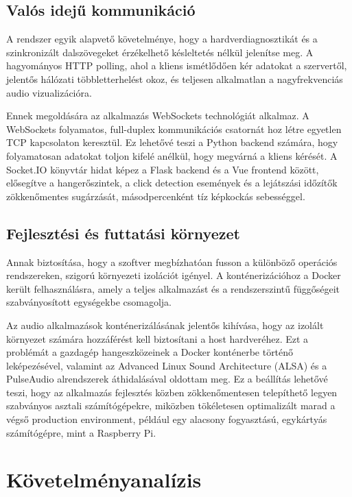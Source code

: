 \documentclass[12pt,a4paper,hungarian]{report}
\begin{document}
\section{Valós idejű kommunikáció}

A rendszer egyik alapvető követelménye, hogy a hardverdiagnosztikát és a szinkronizált dalszövegeket érzékelhető késleltetés nélkül jelenítse meg. A hagyományos HTTP polling, ahol a kliens ismétlődően kér adatokat a szervertől, jelentős hálózati többletterhelést okoz, és teljesen alkalmatlan a nagyfrekvenciás audio vizualizációra.

Ennek megoldására az alkalmazás WebSockets technológiát alkalmaz. A WebSockets folyamatos, full-duplex kommunikációs csatornát hoz létre egyetlen TCP kapcsolaton keresztül. Ez lehetővé teszi a Python backend számára, hogy folyamatosan adatokat toljon kifelé anélkül, hogy megvárná a kliens kérését. A Socket.IO könyvtár hidat képez a Flask backend és a Vue frontend között, elősegítve a hangerőszintek, a click detection események és a lejátszási időzítők zökkenőmentes sugárzását, másodpercenként tíz képkockás sebességgel.

\section{Fejlesztési és futtatási környezet}

Annak biztosítása, hogy a szoftver megbízhatóan fusson a különböző operációs rendszereken, szigorú környezeti izolációt igényel. A konténerizációhoz a Docker került felhasználásra, amely a teljes alkalmazást és a rendszerszintű függőségeit szabványosított egységekbe csomagolja.

Az audio alkalmazások konténerizálásának jelentős kihívása, hogy az izolált környezet számára hozzáférést kell biztosítani a host hardveréhez. Ezt a problémát a gazdagép hangeszközeinek a Docker konténerbe történő leképezésével, valamint az Advanced Linux Sound Architecture (ALSA) és a PulseAudio alrendszerek áthidalásával oldottam meg. Ez a beállítás lehetővé teszi, hogy az alkalmazás fejlesztés közben zökkenőmentesen telepíthető legyen szabványos asztali számítógépekre, miközben tökéletesen optimalizált marad a végső production environment, például egy alacsony fogyasztású, egykártyás számítógépre, mint a Raspberry Pi.

\chapter{Követelményanalízis}
\end{document}
